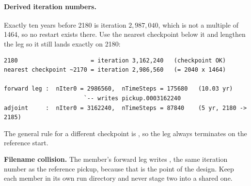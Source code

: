 \paragraph{Derived iteration numbers.}
Exactly ten years before 2180 is iteration $2{,}987{,}040$, which is not a
multiple of 1464, so no restart exists there. Use the nearest checkpoint below it
and lengthen the leg so it still lands exactly on 2180:

\begin{center}
\footnotesize
\begin{verbatim}
2180                     = iteration 3,162,240   (checkpoint OK)
nearest checkpoint ~2170 = iteration 2,986,560   (= 2040 x 1464)

forward leg :  nIter0 = 2986560,  nTimeSteps = 175680   (10.03 yr)
                       `-- writes pickup.0003162240
adjoint     :  nIter0 = 3162240,  nTimeSteps = 87840    (5 yr, 2180 -> 2185)
\end{verbatim}
\end{center}

The general rule for a different checkpoint is
\textbf{}, so the leg always terminates on
the reference start.

\begin{callout}
\textbf{Filename collision.} The member's forward leg writes
, the same iteration number as the reference pickup,
because that is the point of the design. Keep each member in its own run
directory and never stage two into a shared one.
\end{callout}

